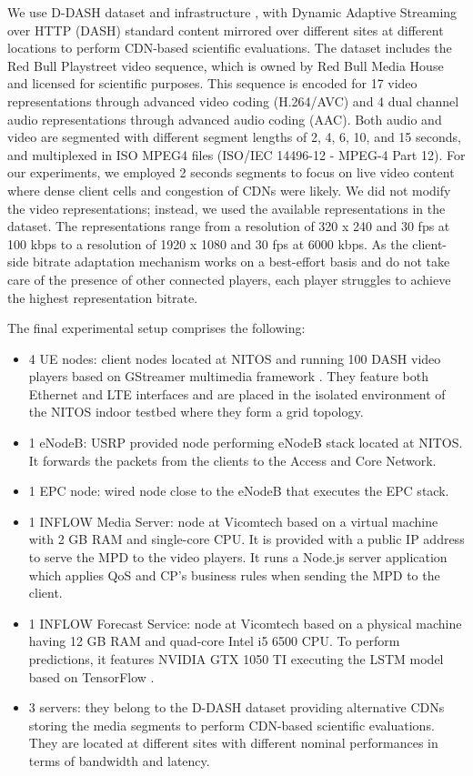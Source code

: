 We use D-DASH dataset and infrastructure \cite{lederer2013}, with Dynamic Adaptive Streaming over HTTP (DASH) standard content mirrored over different sites at different locations to perform CDN-based scientific evaluations.
The dataset includes the Red Bull Playstreet video sequence, which is owned by Red Bull Media House and licensed for scientific purposes. This sequence is encoded for 17 video representations through advanced video coding (H.264/AVC) and 4 dual channel audio representations through advanced audio coding (AAC). Both audio and video are segmented with different segment lengths of 2, 4, 6, 10, and 15 seconds, and multiplexed in ISO MPEG4 files (ISO/IEC 14496-12 - MPEG-4 Part 12). For our experiments, we employed 2 seconds segments to focus on live video content where dense client cells and congestion of CDNs were likely. We did not modify the video representations; instead, we used the available representations in the dataset. The representations range from a resolution of 320 x 240 and 30 fps at 100 kbps to a resolution of 1920 x 1080 and 30 fps at 6000 kbps. As the client-side bitrate adaptation mechanism works on a best-effort basis and do not take care of the presence of other connected players, each player struggles to achieve the highest representation bitrate.

The final experimental setup comprises the following:
\begin{itemize}
	\item 4 UE nodes: client nodes located at NITOS and running 100 DASH video players based on GStreamer multimedia framework \cite{gstreamer}. They feature both Ethernet and LTE interfaces and are placed in the isolated environment of the NITOS indoor testbed where they form a grid topology.
	\item 1 eNodeB: USRP provided node performing eNodeB stack located at NITOS. It forwards the packets from the clients to the Access and Core Network.
	\item 1 EPC node: wired node close to the eNodeB that executes the EPC stack.
	\item 1 INFLOW Media Server: node at Vicomtech based on a virtual machine with 2 GB RAM and single-core CPU. It is provided with a public IP address to serve the MPD to the video players. It runs a Node.js \cite{nodejs} server application which applies QoS and CP's business rules when sending the MPD to the client.
	\item 1 INFLOW Forecast Service: node at Vicomtech based on a physical machine having 12 GB RAM and quad-core Intel i5 6500 CPU. To perform predictions, it features NVIDIA GTX 1050 TI executing the LSTM model based on TensorFlow \cite{tensorflow}.
	\item 3 servers: they belong to the D-DASH dataset \cite{lederer2013} providing alternative CDNs storing the media segments to perform CDN-based scientific evaluations. They are located at different sites with different nominal performances in terms of bandwidth and latency.
\end{itemize}

